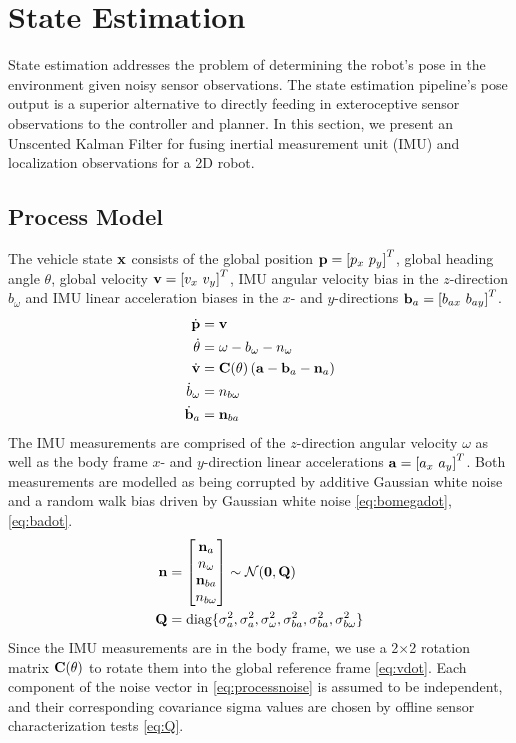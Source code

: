 \section{State Estimation}
\label{sec:state_estimation}

State estimation addresses the problem of determining the robot's pose in the environment given noisy sensor observations.
The state estimation pipeline's pose output is a superior alternative to directly feeding in exteroceptive sensor observations to the controller and planner.
In this section, we present an Unscented Kalman Filter for fusing inertial measurement unit (IMU) and localization observations for a 2D robot.

\subsection{Process Model}
The vehicle state $\mathbf{x}$ consists of the global position $\mbf{p} = \left[ p_x \ p_y \right]^T$, global heading angle $\theta$, global velocity $\mathbf{v} = \left[ v_x \ v_y \right]^T$, IMU angular velocity bias in the $z$-direction $b_\omega$ and IMU linear acceleration biases in the $x$- and $y$-directions $\mathbf{b}_a = \left[ b_{ax} \ b_{ay} \right]^T$.
%
\begin{align}
  \dot{\mbf{p}} &= \mbf{v} \\
  \dot{\theta} &= \omega - b_\omega - n_\omega \\
 \dot{\mbf{v}} &= \mbf{C}(\theta) \left( \mbf{a} - \mbf{b}_a - \mbf{n}_a \right) \label{eq:vdot} \\
\dot{b}_\omega &= n_{b\omega} \label{eq:bomegadot} \\
  \dot{\mbf{b}}_a &= \mbf{n}_{ba} \label{eq:badot}
\end{align}
%
The IMU measurements are comprised of the $z$-direction angular velocity $\omega$ as well as the body frame $x$- and $y$-direction linear accelerations $\mbf{a} = \left[ a_x \ a_y \right]^T$.
Both measurements are modelled as being corrupted by additive Gaussian white noise and a random walk bias driven by Gaussian white noise \eqref{eq:bomegadot}, \eqref{eq:badot}.
\begin{align}
  \mbf{n} &= \bbm \mbf{n}_a \\ n_\omega \\ \mbf{n}_{ba} \\ n_{b\omega} \ebm \sim \mathcal{N}(\mbf{0}, \mbf{Q}) \label{eq:processnoise} \\
  \mbf{Q} &= \text{diag}\{ \sigma_a^2, \sigma_a^2, \sigma_\omega^2, \sigma_{ba}^2, \sigma_{ba}^2, \sigma_{b\omega}^2 \} \label{eq:Q}
\end{align}
Since the IMU measurements are in the body frame, we use a 2$\times$2 rotation matrix $\mathbf{C}(\theta)$ to rotate them into the global reference frame \eqref{eq:vdot}.
Each component of the noise vector in \eqref{eq:processnoise} is assumed to be independent, and their corresponding covariance sigma values are chosen by offline sensor characterization tests \eqref{eq:Q}.

